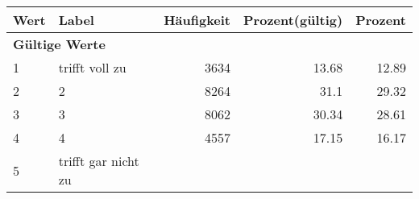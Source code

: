      \begin{longtable}{lXrrr}
     \toprule
     \textbf{Wert} & \textbf{Label} & \textbf{Häufigkeit} & \textbf{Prozent(gültig)} & \textbf{Prozent} \\
     \endhead
     \midrule
     \multicolumn{5}{l}{\textbf{Gültige Werte}}\\

     1 &
     \multicolumn{1}{X}{ trifft voll zu   } &


       \num{3634} &
       \num[round-mode=places,round-precision=2]{13,68} &
         \num[round-mode=places,round-precision=2]{12,89} \\

     2 &
     \multicolumn{1}{X}{ 2   } &


       \num{8264} &
       \num[round-mode=places,round-precision=2]{31,1} &
         \num[round-mode=places,round-precision=2]{29,32} \\

     3 &
     \multicolumn{1}{X}{ 3   } &


       \num{8062} &
       \num[round-mode=places,round-precision=2]{30,34} &
         \num[round-mode=places,round-precision=2]{28,61} \\

     4 &
     \multicolumn{1}{X}{ 4   } &


       \num{4557} &
       \num[round-mode=places,round-precision=2]{17,15} &
         \num[round-mode=places,round-precision=2]{16,17} \\

     5 &
     \multicolumn{1}{X}{ trifft gar nicht zu   } &



\end{longtable}
